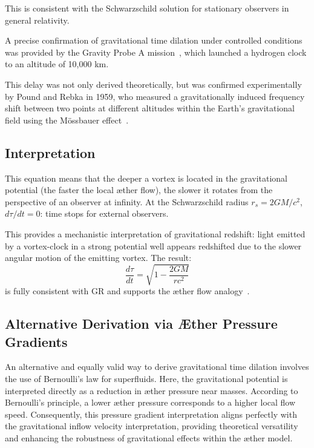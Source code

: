 This is consistent with the Schwarzschild solution for stationary observers in general relativity.

A precise confirmation of gravitational time dilation under controlled conditions was provided by the Gravity Probe A mission~\cite{vessot_levine_1980}, which launched a hydrogen clock to an altitude of 10,000 km.

This delay was not only derived theoretically, but was confirmed experimentally by Pound and Rebka in 1959, who measured a gravitationally induced frequency shift between two points at different altitudes within the Earth's gravitational field using the Mössbauer effect~\cite{pound_rebka_1959}.

\subsection*{Interpretation}

This equation means that the deeper a vortex is located in the gravitational potential (the faster the local æther flow), the slower it rotates from the perspective of an observer at infinity. At the Schwarzschild radius $r_s = 2GM/c^2$, $d\tau/dt = 0$: time stops for external observers.

This provides a mechanistic interpretation of gravitational redshift: light emitted by a vortex-clock in a strong potential well appears redshifted due to the slower angular motion of the emitting vortex. The result:
\[
\boxed{\frac{d\tau}{dt} = \sqrt{1 - \frac{2GM}{rc^2}}}
\]
is fully consistent with GR and supports the æther flow analogy~\cite{Schiller2022-maxforce}.

\subsection*{Alternative Derivation via Æther Pressure Gradients}

An alternative and equally valid way to derive gravitational time dilation involves the use of Bernoulli’s law for superfluids. Here, the gravitational potential is interpreted directly as a reduction in æther pressure near masses. According to Bernoulli’s principle, a lower æther pressure corresponds to a higher local flow speed. Consequently, this pressure gradient interpretation aligns perfectly with the gravitational inflow velocity interpretation, providing theoretical versatility and enhancing the robustness of gravitational effects within the æther model.